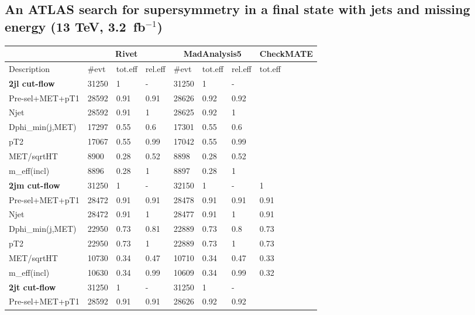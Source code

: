 \documentclass[11pt]{cernrep}
\begin{document}
\subsection{An ATLAS search for supersymmetry in a final
state with jets and missing energy (13 TeV, 3.2~fb$^{-1}$)}

\begin{table}
\footnotesize
 \centering
  \begin{tabular}{ | l || l | l | l || l | l | l || l | }
\hline
    &  \multicolumn{3}{c||}{\bf Rivet} & \multicolumn{3}{c||}{\bf MadAnalysis5} &   {\bf CheckMATE}   \\ \hline
  Description       & \#evt & tot.eff & rel.eff & \#evt & tot.eff & rel.eff &   tot.eff   \\ \hline \hline
{\bf 2jl cut-flow}                  & 31250 & 1 & - & 31250 & 1 & - & \   \\ \hline
Pre-sel+MET+pT1   & 28592 & 0.91 & 0.91 & 28626 & 0.92 & 0.92 & \   \\ \hline
Njet              & 28592 & 0.91 & 1 & 28625 & 0.92 & 1 & \   \\ \hline
Dphi\_min(j,MET)   & 17297 & 0.55 & 0.6 & 17301 & 0.55 & 0.6 & \   \\ \hline
pT2               & 17067 & 0.55 & 0.99 & 17042 & 0.55 & 0.99 & \   \\ \hline
MET/sqrtHT        & 8900 & 0.28 & 0.52 & 8898 & 0.28 & 0.52 & \   \\ \hline
m\_eff(incl)       & 8896 & 0.28 & 1 & 8897 & 0.28 & 1 & \   \\ \hline
\hline
{\bf 2jm cut-flow} & 31250 & 1 & - & 32150 & 1 & - & 1  \\ \hline
Pre-sel+MET+pT1   & 28472 & 0.91 & 0.91 & 28478 & 0.91 & 0.91 & 0.91  \\ \hline
Njet              & 28472 & 0.91 & 1 & 28477 & 0.91 & 1 & 0.91  \\ \hline
Dphi\_min(j,MET)   & 22950 & 0.73 & 0.81 & 22889 & 0.73 & 0.8 & 0.73  \\ \hline
pT2               & 22950 & 0.73 & 1 & 22889 & 0.73 & 1 & 0.73  \\ \hline
MET/sqrtHT        & 10730 & 0.34 & 0.47 & 10710 & 0.34 & 0.47 & 0.33  \\ \hline
m\_eff(incl)       & 10630 & 0.34 & 0.99 & 10609 & 0.34 & 0.99 & 0.32  \\ \hline
\hline
{\bf 2jt cut-flow} & 31250 & 1 & - & 31250 & 1 & - & \   \\ \hline
Pre-sel+MET+pT1   & 28592 & 0.91 & 0.91 & 28626 & 0.92 & 0.92 & \   \\ \hline

\end{tabular}
\end{table}
\end{document}
